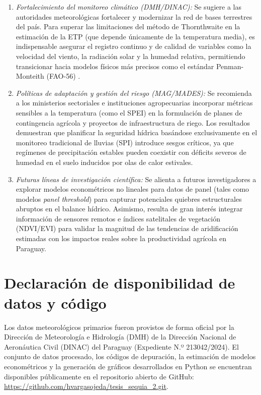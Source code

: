 \documentclass[11pt,a4paper]{article}
\begin{document}
\begin{enumerate}
    \item \textit{Fortalecimiento del monitoreo climático (DMH/DINAC):} Se sugiere a las autoridades meteorológicas fortalecer y modernizar la red de bases terrestres del país. Para superar las limitaciones del método de Thornthwaite en la estimación de la ETP (que depende únicamente de la temperatura media), es indispensable asegurar el registro continuo y de calidad de variables como la velocidad del viento, la radiación solar y la humedad relativa, permitiendo transicionar hacia modelos físicos más precisos como el estándar Penman-Monteith (FAO-56) \citep{allen1998crop}.
    \item \textit{Políticas de adaptación y gestión del riesgo (MAG/MADES):} Se recomienda a los ministerios sectoriales e instituciones agropecuarias incorporar métricas sensibles a la temperatura (como el SPEI) en la formulación de planes de contingencia agrícola y proyectos de infraestructura de riego. Los resultados demuestran que planificar la seguridad hídrica basándose exclusivamente en el monitoreo tradicional de lluvias (SPI) introduce sesgos críticos, ya que regímenes de precipitación estables pueden coexistir con déficits severos de humedad en el suelo inducidos por olas de calor estivales.
    \item \textit{Futuras líneas de investigación científica:} Se alienta a futuros investigadores a explorar modelos econométricos no lineales para datos de panel (tales como modelos \textit{panel threshold}) para capturar potenciales quiebres estructurales abruptos en el balance hídrico. Asimismo, resulta de gran interés integrar información de sensores remotos e índices satelitales de vegetación (NDVI/EVI) para validar la magnitud de las tendencias de aridificación estimadas con los impactos reales sobre la productividad agrícola en Paraguay.
\end{enumerate}

\section*{Declaración de disponibilidad de datos y código}

Los datos meteorológicos primarios fueron provistos de forma oficial por la Dirección de Meteorología e Hidrología (DMH) de la Dirección Nacional de Aeronáutica Civil (DINAC) del Paraguay (Expediente N.º 213042/2024). El conjunto de datos procesado, los códigos de depuración, la estimación de modelos econométricos y la generación de gráficos desarrollados en Python se encuentran disponibles públicamente en el repositorio abierto de GitHub: \url{https://github.com/hvargasojeda/tesis_sequia_2.git}.

 

\end{document}
